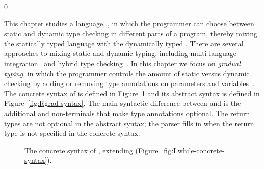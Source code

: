\documentclass[7x10,nocrop]{TimesAPriori_MIT}%
\newcommand{\gray}[1]{{\color{gray} #1}}
\def\racketEd{0}
\def\edition{0}
\begin{document}
\if\edition\racketEd

This chapter studies a language, \LangGrad{}, in which the programmer
can choose between static and dynamic type checking in different parts
of a program, thereby mixing the statically typed \LangLoop{} language
with the dynamically typed \LangDyn{}. There are several approaches to
mixing static and dynamic typing, including multi-language
integration~\citep{Tobin-Hochstadt:2006fk,Matthews:2007zr} and hybrid
type checking~\citep{Flanagan:2006mn,Gronski:2006uq}. In this chapter
we focus on \emph{gradual typing}, in which the
programmer controls the amount of static versus dynamic checking by
adding or removing type annotations on parameters and
variables~\citep{Anderson:2002kd,Siek:2006bh}.
%
The concrete syntax of \LangGrad{} is defined in
Figure~\ref{fig:Rgrad-concrete-syntax} and its abstract syntax is defined
in Figure~\ref{fig:Rgrad-syntax}. The main syntactic difference between
\LangLoop{} and \LangGrad{} is the additional  and 
non-terminals that make type annotations optional. The return types
are not optional in the abstract syntax; the parser fills in
 when the return type is not specified in the concrete
syntax.

\begin{figure}[tp]
\centering
\fbox{
  \begin{minipage}{0.96\textwidth}
    \small
\[
\begin{array}{lcl}
  \itm{param} &::=& \Var \MID \LS\Var \key{:} \Type\RS \\
  \itm{ret} &::=& \epsilon \MID \key{:} \Type \\
  \Exp &::=& \gray{ \Int \MID \CREAD{} \MID \CNEG{\Exp}
     \MID \CADD{\Exp}{\Exp} \MID \CSUB{\Exp}{\Exp} }  \\
    &\MID&  \gray{ \Var \MID \CLET{\Var}{\Exp}{\Exp} }\\
    &\MID& \gray{\key{\#t} \MID \key{\#f} 
     \MID (\key{and}\;\Exp\;\Exp) 
     \MID (\key{or}\;\Exp\;\Exp) 
     \MID (\key{not}\;\Exp) } \\
    &\MID& \gray{ (\key{eq?}\;\Exp\;\Exp) \MID \CIF{\Exp}{\Exp}{\Exp} } \\
    &\MID& \gray{ (\key{vector}\;\Exp\ldots) \MID
          (\key{vector-ref}\;\Exp\;\Int)} \\
    &\MID& \gray{(\key{vector-set!}\;\Exp\;\Int\;\Exp)\MID (\key{void})
    \MID (\Exp \; \Exp\ldots) } \\
    &\MID& \gray{ \LP \key{procedure-arity}~\Exp\RP }
    \MID \CGLAMBDA{\LP\itm{param}\ldots\RP}{\itm{ret}}{\Exp} \\
  &\MID& \gray{ \CSETBANG{\Var}{\Exp}
  \MID \CBEGIN{\Exp\ldots}{\Exp}
  \MID \CWHILE{\Exp}{\Exp} } \\
  \Def &::=& \CGDEF{\Var}{\itm{param}\ldots}{\itm{ret}}{\Exp} \\
  \LangGradM{} &::=& \gray{\Def\ldots \; \Exp}
\end{array}
\]
\end{minipage}
}
\caption{The concrete syntax of \LangGrad{}, extending \LangLoop{} (Figure~\ref{fig:Lwhile-concrete-syntax}).}
\label{fig:Rgrad-concrete-syntax}
\end{figure}
\end{document}
